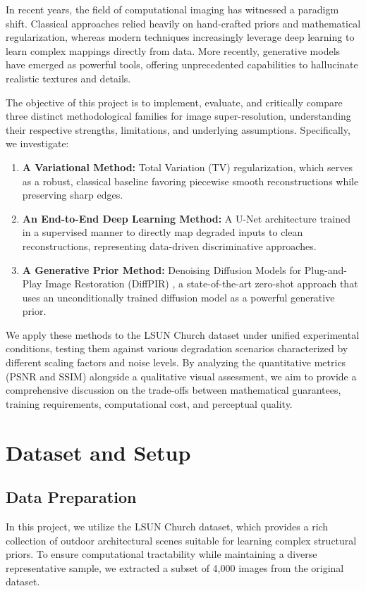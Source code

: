 \documentclass[10pt,journal,compsoc]{IEEEtran}
\begin{document}
In recent years, the field of computational imaging has witnessed a paradigm shift. Classical approaches relied heavily on hand-crafted priors and mathematical regularization, whereas modern techniques increasingly leverage deep learning to learn complex mappings directly from data. More recently, generative models have emerged as powerful tools, offering unprecedented capabilities to hallucinate realistic textures and details.

The objective of this project is to implement, evaluate, and critically compare three distinct methodological families for image super-resolution, understanding their respective strengths, limitations, and underlying assumptions. Specifically, we investigate:
\begin{enumerate}
    \item \textbf{A Variational Method:} Total Variation (TV) regularization, which serves as a robust, classical baseline favoring piecewise smooth reconstructions while preserving sharp edges.
    \item \textbf{An End-to-End Deep Learning Method:} A U-Net architecture trained in a supervised manner to directly map degraded inputs to clean reconstructions, representing data-driven discriminative approaches.
    \item \textbf{A Generative Prior Method:} Denoising Diffusion Models for Plug-and-Play Image Restoration (DiffPIR) \cite{zhu2023diffpir}, a state-of-the-art zero-shot approach that uses an unconditionally trained diffusion model as a powerful generative prior.
\end{enumerate}

We apply these methods to the LSUN Church dataset under unified experimental conditions, testing them against various degradation scenarios characterized by different scaling factors and noise levels. By analyzing the quantitative metrics (PSNR and SSIM) alongside a qualitative visual assessment, we aim to provide a comprehensive discussion on the trade-offs between mathematical guarantees, training requirements, computational cost, and perceptual quality.

\section{Dataset and Setup}
\subsection{Data Preparation}
In this project, we utilize the LSUN Church dataset, which provides a rich collection of outdoor architectural scenes suitable for learning complex structural priors. To ensure computational tractability while maintaining a diverse representative sample, we extracted a subset of 4,000 images from the original dataset.
\end{document}
